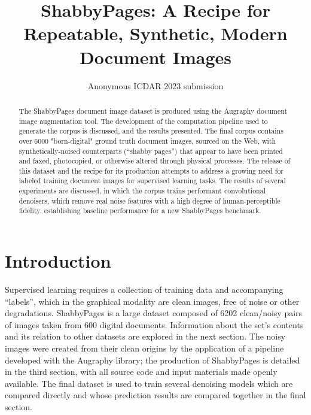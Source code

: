 \documentclass[runningheads]{llncs}
\begin{document}
\title{ShabbyPages: A Recipe for Repeatable, Synthetic, Modern Document Images}
%
%

\author{Anonymous ICDAR 2023 submission}

\maketitle

\begin{abstract}
The ShabbyPages document image dataset is produced using the Augraphy document image augmentation tool.
The development of the computation pipeline used to generate the corpus is discussed, and the results presented.
The final corpus contains over 6000 "born-digital" ground truth document images, sourced on the Web, with synthetically-noised counterparts (``shabby pages'') that appear to have been printed and faxed, photocopied, or otherwise altered through physical processes.
The release of this dataset and the recipe for its production attempts to address a growing need for labeled training document images for supervised learning tasks.
The results of several experiments are discussed, in which the corpus trains performant convolutional denoisers, which remove real noise features with a high degree of human-perceptible fidelity, establishing baseline performance for a new ShabbyPages benchmark.
\end{abstract}

\section{Introduction}
Supervised learning requires a collection of training data and accompanying ``labels'', which in the graphical modality are clean images, free of noise or other degradations.
ShabbyPages is a large dataset composed of 6202 clean/noisy pairs of images taken from 600 digital documents.
Information about the set's contents and its relation to other datasets are explored in the next section.
The noisy images were created from their clean origins by the application of a pipeline developed with the Augraphy library; the production of ShabbyPages is detailed in the third section, with all source code and input materials made openly available.
The final dataset is used to train several denoising models which are compared directly and whose prediction results are compared together in the final section.
\end{document}
